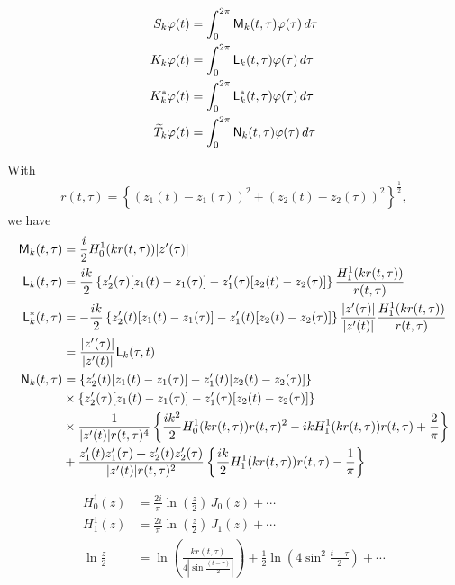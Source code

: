 \begin{subequations}
\begin{align}
  S_k\varphi(t) &= \int_0^{2\pi}{\sf M}_k(t,\tau)\varphi(\tau)\,d\tau \\
  K_k\varphi(t) &= \int_0^{2\pi}{\sf L}_k(t,\tau)\varphi(\tau)\,d\tau \\
  K^*_k\varphi(t) &= \int_0^{2\pi}{\sf L}_k^*(t,\tau)\varphi(\tau)\,d\tau \\
  \widetilde{T}_k\varphi(t) &= \int_0^{2\pi}{\sf N}_k(t,\tau)\varphi(\tau)\,d\tau 
\end{align}
\end{subequations}

With
\begin{align}
  r(t,\tau)=\left\{\left(z_1(t)-z_1(\tau)\right)^2 + \left(z_2(t)-z_2(\tau)\right)^2 \right\}^{\frac{1}{2}},
\end{align}
we have
\begin{subequations}
\begin{align}
  {\sf M}_k(t,\tau) &= \frac{i}{2}H_0^1(kr(t,\tau))|z'(\tau)|\\
  {\sf L}_k(t,\tau) &= \frac{ik}{2}\left\{z'_2(\tau)[z_1(t)-z_1(\tau)]-z'_1(\tau)[z_2(t)-z_2(\tau)]\right\}\frac{H_1^1(kr(t,\tau))}{r(t,\tau)} \\
  {\sf L}_k^*(t,\tau) &= -\frac{ik}{2}\left\{z'_2(t)[z_1(t)-z_1(\tau)]-z'_1(t)[z_2(t)-z_2(\tau)]\right\}\frac{|z'(\tau)|}{|z'(t)|}\frac{H_1^1(kr(t,\tau))}{r(t,\tau)} \\
  &= \frac{|z'(\tau)|}{|z'(t)|} {\sf L}_k(\tau, t) \\
  {\sf N}_k(t, \tau) &= \left\{z'_2(t)[z_1(t)-z_1(\tau)]-z'_1(t)[z_2(t)-z_2(\tau)]\right\}\\
  &\times\left\{z'_2(\tau)[z_1(t)-z_1(\tau)]-z'_1(\tau)[z_2(t)-z_2(\tau)]\right\}\notag \\
  &\times\frac{1}{|z'(t)|r(t, \tau)^4}\left\{\frac{ik^2}{2}H_0^1(kr(t,\tau))r(t,\tau)^2-ikH_1^1(kr(t,\tau))r(t,\tau)+\frac{2}{\pi}\right\}\notag \\
  &+\frac{z'_1(t)z'_1(\tau)+z'_2(t)z'_2(\tau)}{|z'(t)|r(t,\tau)^2}\left\{\frac{ik}{2}H_1^1(kr(t,\tau))r(t,\tau)-\frac{1}{\pi}\right\}\notag
\end{align}
\end{subequations}

\begin{subequations}
\begin{align}
  H_0^1(z) &= \frac{2i}{\pi}\ln\left(\frac{z}{2}\right)\,J_0(z) + \cdots \\
  H_1^1(z) &= \frac{2i}{\pi}\ln\left(\frac{z}{2}\right)\,J_1(z) + \cdots \\
  \ln\frac{z}{2} &= \ln\left(\frac{kr(t,\tau)}{4|\sin\frac{(t-\tau)}{2}|}\right) + \frac{1}{2}\ln\left(4\sin^2\frac{t-\tau}{2}\right) + \cdots
\end{align}
\end{subequations}

